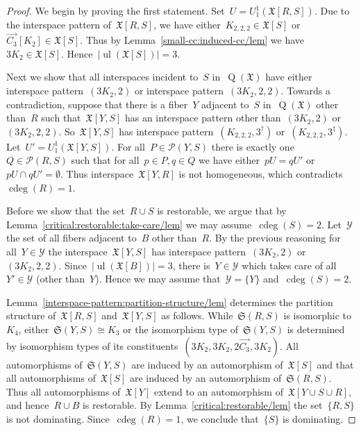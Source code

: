 \documentclass[english,a4paper]{article}
\theoremstyle{plain}
\theoremstyle{definition}
\newcommand{\coherentConfig}{\ensuremath{\mathfrak{X}}}
\newcommand{\interspace}[2]{\ensuremath{\coherentConfig[#1,#2]}}
\newcommand{\inducedCC}[1]{\ensuremath{\coherentConfig[#1]}}
\DeclareMathOperator*{\ul}{ul}
\DeclareMathOperator*{\Quotient}{Q}
\newcommand{\quotientGraph}[1]{\ensuremath{\Quotient(#1)}}
\DeclareMathOperator{\ColorDeg}{cdeg}
\newcommand{\colorDeg}[1]{\ensuremath{\ColorDeg\left(#1\right)}}
\newcommand{\equivalenceClasses}[1]{\ensuremath{\mathcal{P}(#1)}}
\newcommand{\partitionStructure}[1]{\ensuremath{\mathfrak{S}(#1)}}
\newcommand{\ipsixMatching}             {\ensuremath{(\disjointCliques{3}{2},2)}}
\newcommand{\ipsixMatchingTwice}        {\ensuremath{(\disjointCliques{3}{2},2,2)}}
\newcommand{\ipsixMatchingComplement} {\ensuremath{(\clique{2,2,2},3^\dag)}}
\newcommand{\ipsixMatchingComplementD}{\ensuremath{(\clique{2,2,2},3^\ddag)}}
\newcommand{\clique}[1]{\ensuremath{K_{#1}}}
\newcommand{\disjointCliques}[2]{\ensuremath{#1 \clique{#2}}}
\begin{document}
\begin{proof}
    We begin by proving the first statement.
    Set~$U = U^1_1(\interspace{R}{S})$.
    Due to the interspace pattern of~$\interspace{R}{S}$, we have either~$\clique{2,2,2} \in \inducedCC{S}$ or~$\overrightarrow{C_3}[K_2] \in \inducedCC{S}$.
    Thus by Lemma~\ref{small-cc:induced-cc/lem} we have~$\disjointCliques{3}{2} \in \inducedCC{S}$.
    Hence~$|\ul(\inducedCC{S})| = 3$.

    Next we show that all interspaces incident to~$S$ in~$\quotientGraph{\coherentConfig}$ have either interspace pattern~$\ipsixMatching$ or interspace pattern~$\ipsixMatchingTwice$.
    Towards a contradiction, suppose that there is a fiber~$Y$ adjacent to~$S$ in~$\quotientGraph{\coherentConfig}$ other than~$R$ such that~$\interspace{Y}{S}$ has an interspace pattern other than~$\ipsixMatching$ or~$\ipsixMatchingTwice$.
    So~$\interspace{Y}{S}$ has interspace pattern~$\ipsixMatchingComplement$ or~$\ipsixMatchingComplementD$.
    Let~$U' = U^1_1(\interspace{Y}{S})$.
    For all~$P \in \equivalenceClasses{Y,S}$ there is exactly one~$Q\in \equivalenceClasses{R,S}$ such that for all~$p \in P,q\in Q$ we have either~$p U = q U'$ or~$p U \cap q U' = \emptyset$.
    Thus interspace~$\interspace{Y}{R}$ is not homogeneous, which contradicts~$\colorDeg{R} = 1$.

    Before we show that the set~$R \cup S$ is restorable, we argue that by Lemma~\ref{critical:restorable:take-care/lem} we may assume~$\colorDeg{S} = 2$.
    Let~$\mathcal{Y}$ the set of all fibers adjacent to~$B$ other than~$R$.
    By the previous reasoning for all~$Y \in \mathcal{Y}$ the interspace~$\interspace{Y}{S}$ has interspace pattern~$\ipsixMatching$ or~$\ipsixMatchingTwice$.
    Since~$|\ul(\inducedCC{B})| = 3$, there is~$Y \in \mathcal{Y}$ which takes care of all~$Y' \in \mathcal{Y}$ (other than~$Y$).
    Hence we may assume that~$\mathcal{Y} = \{Y\}$ and~$\colorDeg{S} = 2$.

    Lemma~\ref{interspace-pattern:partition-structure/lem} determines the partition structure of~$\interspace{R}{S}$ and~$\interspace{Y}{S}$ as follows.
    While~$\partitionStructure{R,S}$ is isomorphic to~$K_4$, either~$\partitionStructure{Y,S} \cong K_3$ or the isomorphism type of~$\partitionStructure{Y,S}$ is determined by isomorphism types of its constituents~$(3K_2,3K_2,2\overrightarrow{C_3},3K_2)$.
    All automorphisms of~$\partitionStructure{Y,S}$ are induced by an automorphism of~$\inducedCC{S}$ and that all automorphisms of~$\inducedCC{S}$ are induced by an automorphism of~$\partitionStructure{R,S}$.
    Thus all automorphisms of~$\inducedCC{Y}$ extend to an automorphism of~$\inducedCC{Y \cup S \cup R}$, and hence~$R \cup B$ is restorable.
    By Lemma~\ref{critical:restorable/lem} the set~$\{R,S\}$ is not dominating.
    Since~$\colorDeg{R} = 1$, we conclude that~$\{S\}$ is dominating.


\end{proof}
\end{document}
